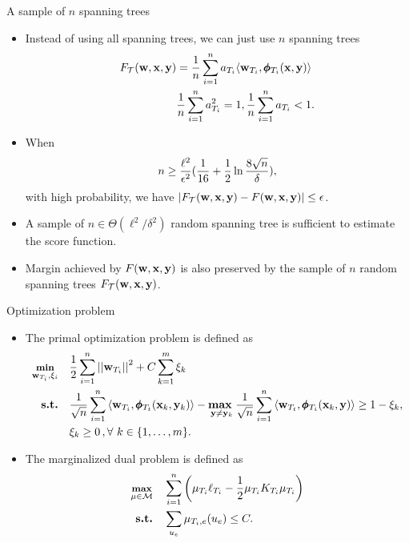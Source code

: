 \documentclass[first=dgreen,second=purple,logo=yellowexc]{aaltoslides}
\begin{document}
\begin{frame}{A sample of $n$ spanning trees}
	\begin{itemize}\footnotesize
		\item Instead of using all spanning trees, we can just use $n$ spanning trees
		\begin{align*}\footnotesize
			F_{\mathcal{T}}(\mathbf {w},\mathbf {x},\mathbf {y}) &= \frac{1}{n}\sum_{i=1}^{n}a_{T_i}\langle \mathbf {w}_{T_i}, \pmb \phi_{T_i}(\mathbf {x},\mathbf {y}) \rangle\\
			  &\frac{1}{n}\sum_{i=1}^{n}a_{T_i}^2=1,  \frac{1}{n}\sum_{i=1}^{n}a_{T_i}<1.
		\end{align*}
		\item When
		\begin{align*}\footnotesize
			n\ge\frac{\ell^2}{\epsilon^2}(\frac{1}{16}+\frac{1}{2}\ln\frac{8\sqrt{n}}{\delta}),
		\end{align*}
		with high probability, we have $|F_{\mathcal{T}}(\mathbf {w},\mathbf {x},\mathbf {y})-F(\mathbf {w},\mathbf {x},\mathbf {y})|\le\epsilon$.
		\item A sample of $n\in\Theta(\ell^2/\delta^2)$ random spanning tree is sufficient to estimate the score function.
		\item Margin achieved by $F(\mathbf {w},\mathbf {x},\mathbf {y})$ is also preserved by the sample of $n$ random spanning trees $F_{\mathcal{T}}(\mathbf {w},\mathbf {x},\mathbf {y})$.
	\end{itemize}
\end{frame}


\begin{frame}{Optimization problem}
	\begin{itemize}\footnotesize
		\item The primal optimization problem is defined as
		\begin{align*}\footnotesize
			\underset{\mathbf {w}_{T_i},\xi_i}{\textbf{min}} & \quad \frac{1}{2}\sum_{i=1}^{n}\left|\left| \mathbf {w}_{T_i} \right|\right|^2 + C\sum_{k=1}^{m}\xi_k\\
			\textbf{s.t.} & \quad \frac{1}{\sqrt{n}}\sum_{i=1}^{n}{ \langle \mathbf {w}_{T_i}, \pmb \phi_{T_t}(\mathbf {x}_k,\mathbf {y}_k) \rangle} - \underset{\mathbf {y} \neq \mathbf {y}_k}{\textbf{max}\ } \frac{1}{\sqrt{n}}\sum_{i=1}^{n}{\langle \mathbf {w}_{T_t}, \pmb \phi_{T_i}(\mathbf {x}_k,\mathbf {y}) \rangle } \geq 1 -  \xi_k, \\
			& \quad \xi_k\ge0\, , \forall\ k \in \{ 1,\dots,m \}.
		\end{align*}
		\item The marginalized dual problem is defined as
		\begin{align*}\footnotesize
			\underset{\mathbf {\mu}\in\mathcal{M}}{\textbf{max}} & \quad \sum_{i=1}^{n}\left( \mathbf {\mu}_{T_i}\mathbf {\ell}_{T_i} - \frac{1}{2}\mathbf {\mu}_{T_i}K_{T_i}\mathbf {\mu}_{T_i}\right)\\
			\textbf{s.t.} & \quad \sum_{u_e}\mathbf {\mu}_{T_i,e}(u_e)\le C.
		\end{align*}
	\end{itemize}
\end{frame}
\end{document}
